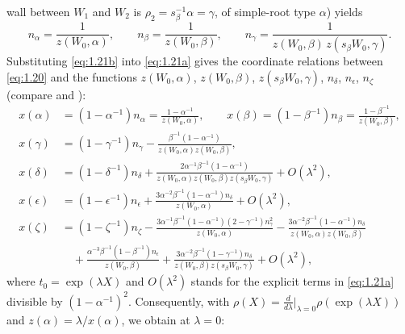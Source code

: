 \documentclass[12pt,letterpaper]{amsart}
\theoremstyle{plain}
\theoremstyle{definition}
\theoremstyle{remark}
\theoremstyle{definition}
\begin{document}
wall between $W_1$ and $W_2$ is $\rho_2=s_\beta^{-1}\alpha=\gamma$, of
simple-root type $\alpha$) yields
\begin{equation}\tag{1.21b}\label{eq:1.21b}
n_\alpha = \frac{1}{z(W_0,\alpha)},\qquad
n_\beta = \frac{1}{z(W_0,\beta)},\qquad
n_\gamma = \frac{1}{z(W_0,\beta)\,z(s_\beta W_0,\gamma)}.
\end{equation}
Substituting \eqref{eq:1.21b} into \eqref{eq:1.21a} gives the coordinate
relations between \eqref{eq:1.20} and the functions
$z(W_0,\alpha)$, $z(W_0,\beta)$, $z(s_\beta W_0,\gamma)$, $n_\delta$,
$n_\epsilon$, $n_\zeta$ (compare \cite[Ch.~II]{Ha92a} and
\cite[\S7, Lemmas~7.13--7.15]{Ha89}):
\begin{equation}\tag{1.22}\label{eq:1.22}
\begin{split}
x(\alpha)&=(1-\alpha^{-1})n_\alpha = \frac{1-\alpha^{-1}}{z(W_0,\alpha)},\qquad
x(\beta)=(1-\beta^{-1})n_\beta = \frac{1-\beta^{-1}}{z(W_0,\beta)},\\
x(\gamma)&=(1-\gamma^{-1})n_\gamma
- \frac{\beta^{-1}(1-\alpha^{-1})}{z(W_0,\alpha)z(W_0,\beta)},\\
x(\delta)&=(1-\delta^{-1})n_\delta
+ \frac{2\alpha^{-1}\beta^{-1}(1-\alpha^{-1})}{z(W_0,\alpha)z(W_0,\beta)z(s_\beta W_0,\gamma)}
+ O(\lambda^2),\\
x(\epsilon)&=(1-\epsilon^{-1})n_\epsilon
+ \frac{3\alpha^{-2}\beta^{-1}(1-\alpha^{-1})n_\delta}{z(W_0,\alpha)}
+ O(\lambda^2),\\
x(\zeta)&=(1-\zeta^{-1})n_\zeta
- \frac{3\alpha^{-1}\beta^{-1}(1-\alpha^{-1})(2-\gamma^{-1})n_\gamma^2}{z(W_0,\alpha)}
- \frac{3\alpha^{-2}\beta^{-1}(1-\alpha^{-1})n_\delta}{z(W_0,\alpha)z(W_0,\beta)}\\
&\quad + \frac{\alpha^{-3}\beta^{-1}(1-\beta^{-1})n_\epsilon}{z(W_0,\beta)}
+ \frac{3\alpha^{-2}\beta^{-1}(1-\gamma^{-1})n_\delta}{z(W_0,\beta)z(s_\beta W_0,\gamma)}
+ O(\lambda^2),
\end{split}
\end{equation}
where $t_0=\exp(\lambda X)$ and $O(\lambda^2)$ stands for the explicit terms
in \eqref{eq:1.21a} divisible by $(1-\alpha^{-1})^2$.
Consequently, with $\rho(X)=\frac{d}{d\lambda}\big|_{\lambda=0}\rho(\exp(\lambda X))$
and $z(\alpha)=\lambda/x(\alpha)$, we obtain at $\lambda=0$:
\end{document}
